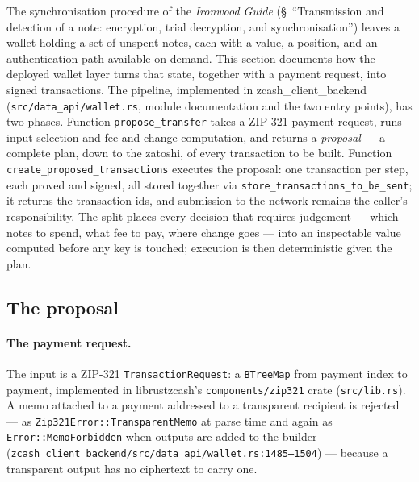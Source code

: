 \documentclass[11pt,a4paper]{article}
\theoremstyle{definition}
\begin{document}
The synchronisation procedure of the \emph{Ironwood Guide} (\S~``Transmission
and detection of a note: encryption, trial decryption, and synchronisation'')
leaves a wallet holding a set of unspent notes, each with a value, a position,
and an authentication path available on demand. This section documents how the
deployed wallet layer turns that state, together with a payment request, into
signed transactions. The pipeline, implemented in
\textsf{zcash\_client\_backend} (\texttt{src/data\_api/wallet.rs}, module
documentation and the two entry points), has two phases. Function
\texttt{propose\_transfer} takes a ZIP-321 payment request, runs input
selection and fee-and-change computation, and returns a \emph{proposal} --- a
complete plan, down to the zatoshi, of every transaction to be built. Function
\texttt{create\_proposed\_transactions} executes the proposal: one transaction
per step, each proved and signed, all stored together via
\texttt{store\_transactions\_to\_be\_sent}; it returns the transaction ids,
and submission to the network remains the caller's responsibility. The split
places every decision that requires judgement --- which notes to spend, what
fee to pay, where change goes --- into an inspectable value computed before
any key is touched; execution is then deterministic given the plan.

\subsection{The proposal}\label{sec:pipeline-proposal}

\paragraph{The payment request.} The input is a ZIP-321
\texttt{TransactionRequest}: a \texttt{BTreeMap} from payment index to
payment, implemented in \textsf{librustzcash}'s \texttt{components/zip321}
crate (\texttt{src/lib.rs}). A memo attached to a payment addressed to a
transparent recipient is rejected --- as \texttt{Zip321Error::TransparentMemo}
at parse time and again as \texttt{Error::MemoForbidden} when outputs are
added to the builder
(\texttt{zcash\_client\_backend/src/data\_api/wallet.rs:1485--1504}) ---
because a transparent output has no ciphertext to carry one.
\end{document}
